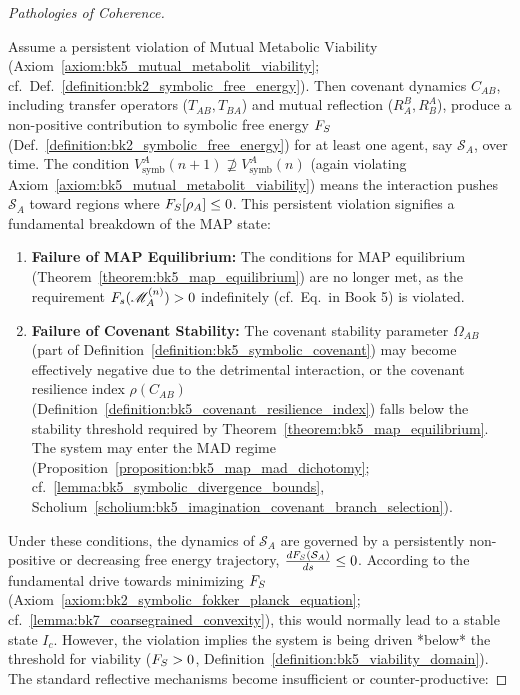 \begin{proof}[Pathologies of Coherence]
\label{proof:bk9_pathologies_of_coherence}
\leavevmode

Assume a persistent violation of Mutual Metabolic Viability
(Axiom~\ref{axiom:bk5_mutual_metabolit_viability};
cf.~Def.~\ref{definition:bk2_symbolic_free_energy}).
Then covenant dynamics $C_{AB}$, including transfer operators
($T_{AB}, T_{BA}$) and mutual reflection ($R^B_A, R^A_B$), produce a
non-positive contribution to symbolic free energy $F_S$
(Def.~\ref{definition:bk2_symbolic_free_energy}) for at least one agent, say
$\mathcal{S}_A$, over time.
The condition $V^A_{\text{symb}}(n+1) \not\supseteq V^A_{\text{symb}}(n)$
(again violating Axiom~\ref{axiom:bk5_mutual_metabolit_viability}) means the
interaction pushes $\mathcal{S}_A$ toward regions where
$F_S[\rho_A] \le 0$.
This persistent violation signifies a fundamental breakdown of the MAP state:
\begin{enumerate}
    \item \textbf{Failure of MAP Equilibrium:} The conditions for MAP equilibrium (Theorem~\ref{theorem:bk5_map_equilibrium}) are no longer met, as the requirement $F_s(\mathscr{M}_A^{(n)}) > 0$ indefinitely (cf.~Eq.~in Book 5) is violated.
    \item \textbf{Failure of Covenant Stability:} The covenant stability parameter $\Omega_{AB}$ (part of Definition~\ref{definition:bk5_symbolic_covenant}) may become effectively negative due to the detrimental interaction, or the covenant resilience index $\rho(C_{AB})$ (Definition~\ref{definition:bk5_covenant_resilience_index}) falls below the stability threshold required by Theorem~\ref{theorem:bk5_map_equilibrium}. The system may enter the MAD regime (Proposition~\ref{proposition:bk5_map_mad_dichotomy}; cf.~\ref{lemma:bk5_symbolic_divergence_bounds}, Scholium~\ref{scholium:bk5_imagination_covenant_branch_selection}).
\end{enumerate}
Under these conditions, the dynamics of $\mathcal{S}_A$ are governed by a persistently non-positive or decreasing free energy trajectory, $\frac{dF_S(\mathcal{S}_A)}{ds} \le 0$. According to the fundamental drive towards minimizing $F_S$ (Axiom~\ref{axiom:bk2_symbolic_fokker_planck_equation}; cf.~\ref{lemma:bk7_coarsegrained_convexity}), this would normally lead to a stable state $I_c$. However, the violation implies the system is being driven *below* the threshold for viability ($F_S > 0$, Definition~\ref{definition:bk5_viability_domain}).
The standard reflective mechanisms become insufficient or counter-productive:

\end{proof}
